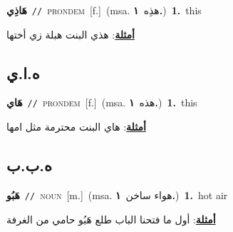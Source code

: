 \documentclass[10pt,a4paper,twoside]{article} %
\begin{document}
\begin{multicols}{2}
{{\setlength\topsep{0pt}\textbf{\foreignlanguage{arabic}{هَاذِي}}\ {\color{gray}\texttt{//}\color{black}}\ \textsc{pron\textunderscore dem}\ [f.]\ \color{gray}(msa. \foreignlanguage{arabic}{هذِه}~\foreignlanguage{arabic}{\textbf{١.}})\color{black}\ \textbf{1.}~this\  \begin{flushright}\color{gray}\foreignlanguage{arabic}{\textbf{\underline{\foreignlanguage{arabic}{أمثلة}}}: هذي البنت هبلة زي أختها}\end{flushright}\color{black}} \vspace{2mm}

\vspace{-3mm}
\subsection*{\color{blue}\foreignlanguage{arabic}{ه.ا.ي}\color{blue}{ (ntws)}} 

{\setlength\topsep{0pt}\textbf{\foreignlanguage{arabic}{هَاي}}\ {\color{gray}\texttt{//}\color{black}}\ \textsc{pron\textunderscore dem}\ [f.]\ \color{gray}(msa. \foreignlanguage{arabic}{هذه}~\foreignlanguage{arabic}{\textbf{١.}})\color{black}\ \textbf{1.}~this\  \begin{flushright}\color{gray}\foreignlanguage{arabic}{\textbf{\underline{\foreignlanguage{arabic}{أمثلة}}}: هاي البنت محترمة مثل امها}\end{flushright}\color{black}} \vspace{2mm}

\vspace{-3mm}
\subsection*{\color{blue}\foreignlanguage{arabic}{ه.ب.ب}\color{blue}{}} 

{\setlength\topsep{0pt}\textbf{\foreignlanguage{arabic}{هَبُو}}\ {\color{gray}\texttt{//}\color{black}}\ \textsc{noun}\ [m.]\ \color{gray}(msa. \foreignlanguage{arabic}{هواء ساخن}~\foreignlanguage{arabic}{\textbf{١.}})\color{black}\ \textbf{1.}~hot air\  \begin{flushright}\color{gray}\foreignlanguage{arabic}{\textbf{\underline{\foreignlanguage{arabic}{أمثلة}}}: أول ما فتحنا الباب طلع هَبُو حامي من الغرفة}\end{flushright}\color{black}} \vspace{2mm}

}
\end{multicols}
\end{document}
